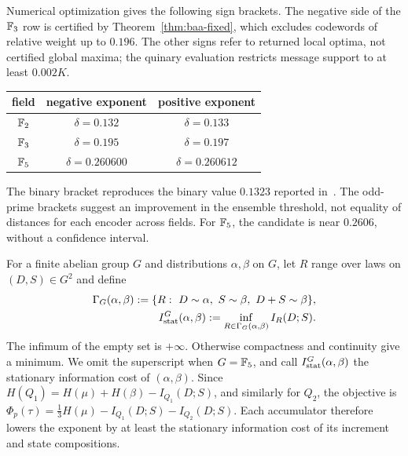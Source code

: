 Numerical optimization gives the following sign brackets.  The negative side
of the $\mathbb F_3$ row is certified by Theorem~\ref{thm:baa-fixed}, which excludes
codewords of relative weight up to $0.196$.  The other signs refer to returned
local optima, not certified global maxima; the quinary evaluation restricts
message support to at least $0.002K$.
\begin{center}
\begin{tabular}{@{}ccc@{}}
\toprule
field & negative exponent & positive exponent \\
\midrule
$\mathbb F_2$ & $\delta=0.132$ & $\delta=0.133$ \\
$\mathbb F_3$ & $\delta=0.195$ & $\delta=0.197$ \\
$\mathbb F_5$ & $\delta=0.260600$ & $\delta=0.260612$ \\
\bottomrule
\end{tabular}
\end{center}
The binary bracket reproduces the binary value $0.1323$ reported
in~\cite{kliewer08}.  The odd-prime brackets suggest an improvement in the
ensemble threshold, not equality of distances for each encoder across fields.
For $\mathbb F_5$, the candidate is near $0.2606$, without a confidence interval.

For a finite abelian group $G$ and distributions $\alpha,\beta$ on $G$,
let $R$ range over laws on $(D,S)\in G^2$ and define
\begin{align*}
 \Gamma_G(\alpha,\beta):=\{R:\ D\sim\alpha,\ S\sim\beta,
                                      \ D+S\sim\beta\},\\
 I_{\rm stat}^G(\alpha,\beta):=
       \inf_{R\in\Gamma_G(\alpha,\beta)}I_R(D;S).
\end{align*}
The infimum of the empty set is $+\infty$. Otherwise compactness and
continuity give a minimum. We omit the superscript when $G=\mathbb F_5$, and call
$I_{\rm stat}^G(\alpha,\beta)$ the stationary information cost of
$(\alpha,\beta)$.  Since $H(Q_1)=H(\mu)+H(\beta)-I_{Q_1}(D;S)$, and
similarly for $Q_2$, the objective is
$\Phi_p(\tau)=\tfrac13H(\mu)-I_{Q_1}(D;S)-I_{Q_2}(D;S)$.  Each accumulator
therefore lowers the exponent by at least the stationary information cost of
its increment and state compositions.

